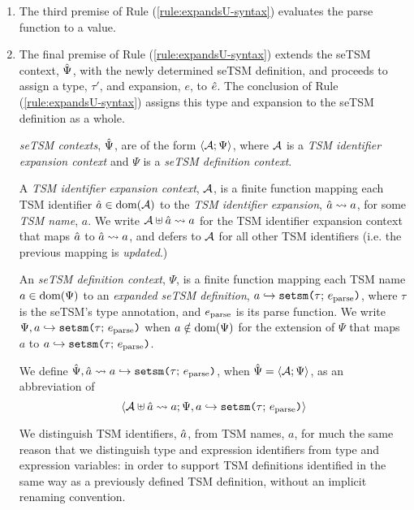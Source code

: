 \begin{enumerate}
\item The third premise of Rule (\ref{rule:expandsU-syntax}) evaluates the parse function to a value.
\item The final premise of Rule (\ref{rule:expandsU-syntax}) extends the seTSM context, $\hat{\Psi}$, with the newly determined {seTSM definition}, and proceeds to assign a type, $\tau'$, and expansion, $e$, to ${\hat e}$. The conclusion of Rule (\ref{rule:expandsU-syntax}) assigns this type and expansion to the seTSM definition as a whole.%



\emph{seTSM contexts}, $\hat{\Psi}$, are of the form $\langle \mathcal{A}; \Psi \rangle$, where $\mathcal{A}$ is a \emph{TSM identifier expansion context} and $\Psi$ is a \emph{seTSM definition context}. 

A \emph{TSM identifier expansion context}, $\mathcal{A}$, is a finite function mapping each TSM identifier $\hat{a} \in \text{dom}(\mathcal{A})$ to the \emph{TSM identifier expansion}, $\hat{a} \leadsto a$, for some \emph{TSM name}, $a$. We write $\mathcal{A} \uplus \hat{a} \leadsto a$ for the TSM identifier expansion context that maps $\hat{a}$ to $\hat{a} \leadsto a$, and defers to $\mathcal{A}$ for all other TSM identifiers (i.e. the previous mapping is \emph{updated}.)

An \emph{seTSM definition context}, $\Psi$, is a finite function mapping each TSM name $a \in \text{dom}(\Psi)$ to an \emph{expanded seTSM definition}, $a \hookrightarrow \texttt{setsm}\texttt{(}\tau;\,e_\text{parse}\texttt{)}$, where $\tau$ is the seTSM's type annotation, and $e_\text{parse}$ is its parse function. We write $\Psi, a \hookrightarrow \texttt{setsm}\texttt{(}\tau;\,e_\text{parse}\texttt{)}$ when $a \notin \text{dom}(\Psi)$ for the extension of $\Psi$ that maps $a$ to $a \hookrightarrow \texttt{setsm}\texttt{(}\tau;\,e_\text{parse}\texttt{)}$. %

We define $\hat{\Psi}, \hat{a} \leadsto a \hookrightarrow \texttt{setsm}\texttt{(}\tau;\,e_\text{parse}\texttt{)}$, when $\hat{\Psi}=\langle \mathcal{A}; \Psi \rangle$, as an abbreviation of \[\langle \mathcal{A} \uplus \hat{a} \leadsto a; \Psi, a \hookrightarrow \texttt{setsm}\texttt{(}\tau;\,e_\text{parse}\texttt{)} \rangle\]

We distinguish TSM identifiers, $\hat{a}$, from TSM names, $a$, for much the same reason that we distinguish type and expression identifiers from type and expression variables: in order to support TSM definitions identified in the same way as a previously defined TSM definition, without an implicit renaming convention. %

\end{enumerate}


